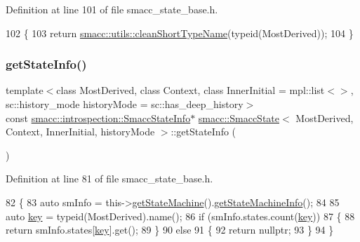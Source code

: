 Definition at line 101 of file smacc\+\_\+state\+\_\+base.\+h.


\begin{DoxyCode}
102     \{
103       \textcolor{keywordflow}{return} \hyperlink{namespacesmacc_1_1utils_aacd1975bb7cd9bec4b50e111a2ae7edb}{smacc::utils::cleanShortTypeName}(\textcolor{keyword}{typeid}(MostDerived));
104     \}
\end{DoxyCode}
\mbox{\label{classsmacc_1_1SmaccState_ab7825f5db39dcbee4e4384913026d3e2}} 
\subsubsection{\texorpdfstring{get\+State\+Info()}{getStateInfo()}}
{\footnotesize\ttfamily template$<$class Most\+Derived, class Context, class Inner\+Initial = mpl\+::list$<$$>$, sc\+::history\+\_\+mode history\+Mode = sc\+::has\+\_\+deep\+\_\+history$>$ \\
const \hyperlink{classsmacc_1_1introspection_1_1SmaccStateInfo}{smacc\+::introspection\+::\+Smacc\+State\+Info}$\ast$ \hyperlink{classsmacc_1_1SmaccState}{smacc\+::\+Smacc\+State}$<$ Most\+Derived, Context, Inner\+Initial, history\+Mode $>$\+::get\+State\+Info (\begin{DoxyParamCaption}{ }\end{DoxyParamCaption})\hspace{0.3cm}{\ttfamily [inline]}}



Definition at line 81 of file smacc\+\_\+state\+\_\+base.\+h.


\begin{DoxyCode}
82     \{
83       \textcolor{keyword}{auto} smInfo = this->\hyperlink{classsmacc_1_1SmaccState_afc39f8e0ca4001b2159a100da2fccd0e}{getStateMachine}().\hyperlink{classsmacc_1_1ISmaccStateMachine_a3b1facb0477325fe43b447fc21d9eb7d}{getStateMachineInfo}();
84 
85       \textcolor{keyword}{auto} \hyperlink{namespacekeyboard__server__node_af0ebd8a9e1564ddc13a227c727602466}{key} = \textcolor{keyword}{typeid}(MostDerived).name();
86       \textcolor{keywordflow}{if} (smInfo.states.count(\hyperlink{namespacekeyboard__server__node_af0ebd8a9e1564ddc13a227c727602466}{key}))
87       \{
88         \textcolor{keywordflow}{return} smInfo.states[\hyperlink{namespacekeyboard__server__node_af0ebd8a9e1564ddc13a227c727602466}{key}].get();
89       \}
90       \textcolor{keywordflow}{else}
91       \{
92         \textcolor{keywordflow}{return} \textcolor{keyword}{nullptr};
93       \}
94     \}
\end{DoxyCode}
\mbox{\label{classsmacc_1_1SmaccState_afc39f8e0ca4001b2159a100da2fccd0e}} 
